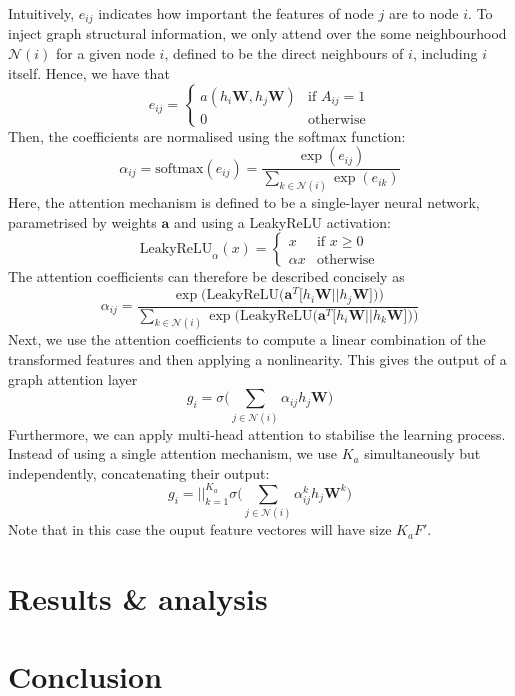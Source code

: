\documentclass[12pt]{article}
\theoremstyle{definition}
\begin{document}
Intuitively, $e_{ij}$ indicates how important the features of node $j$ are to node $i$. To inject graph structural information, we only attend over the some neighbourhood $\mathcal{N}(i)$ for a given node $i$, defined to be the direct neighbours of $i$, including $i$ itself. Hence, we have that
\begin{equation*}
e_{ij} = \begin{cases}
				a(h_i \textbf{W}, h_j \textbf{W}) &\text{if $A_{ij} = 1$}\\
				0 &\text{otherwise}
			\end{cases}
\end{equation*}
Then, the coefficients are normalised using the softmax function:
\[
\alpha_{ij} = \textrm{softmax}(e_{ij}) = \frac{\exp(e_{ij})}{\sum_{k \in \mathcal{N}(i)} \exp(e_{ik})}
\]
Here, the attention mechanism is defined to be a single-layer neural network, parametrised by weights $\textbf{a}$ and using a LeakyReLU activation: 
\[
\textrm{LeakyReLU}_{\alpha}(x) = 
	\begin{cases}
		x &\text{if $x \ge 0$}\\
		\alpha x &\text{otherwise}
	\end{cases}
\]
The attention coefficients can therefore be described concisely as
\[
\alpha_{ij} = \frac{\exp \big( \textrm{LeakyReLU}\big( \textbf{a}^T \big[ h_i \textbf{W} \vert\vert h_j \textbf{W} \big] \big) \big)}
{
\sum_{k \in \mathcal{N}(i)} \exp \big( \textrm{LeakyReLU}\big( \textbf{a}^T \big[ h_i \textbf{W} \vert\vert h_k \textbf{W} \big] \big) \big)
}
\]
Next, we use the attention coefficients to compute a linear combination of the transformed features and then applying a nonlinearity. This gives the output of a graph attention layer
\[
g_i = \sigma \big( \sum_{j \in \mathcal{N}(i)} \alpha_{ij} h_j \textbf{W} \big)
\]
Furthermore, we can apply multi-head attention to stabilise the learning process. Instead of using a single attention mechanism, we use $K_a$ simultaneously but independently, concatenating their output:
\[
g_i = {\Big\vert\Big\vert}_{k=1}^{K_a} \sigma \big( \sum_{j \in \mathcal{N}(i)} \alpha_{ij}^k h_j \textbf{W}^k \big)
\]
Note that in this case the ouput feature vectores will have size $K_a F'$.
\section{Results \& analysis}

\section{Conclusion}



\end{document}
